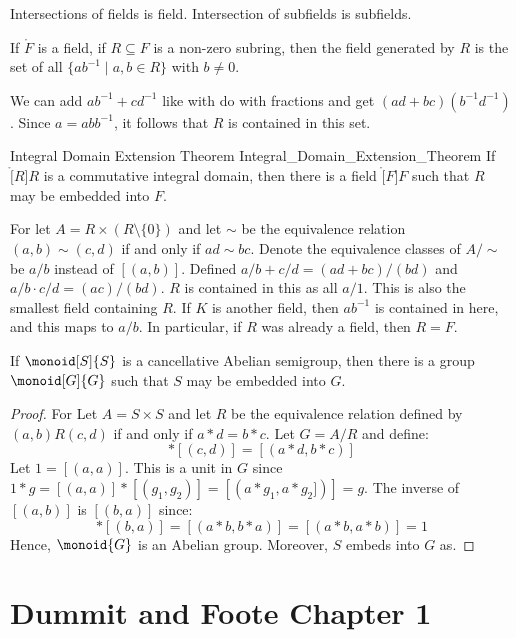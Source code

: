             Intersections of fields is field. Intersection of subfields is
            subfields.
            \begin{theorem}
                If $\ring{F}$ is a field, if $R\subseteq{F}$ is a non-zero
                subring, then the field generated by $R$ is the set of all
                $\{ab^{\minus{1}}\;|\;a,b\in{R}\}$ with $b\ne{0}$.
            \end{theorem}
            We can add $ab^{\minus{1}}+cd^{\minus{1}}$ like with do with
            fractions and get $(ad+bc)(b^{\minus{1}}d^{\minus{1}})$.
            Since $a=abb^{\minus{1}}$, it follows that $R$ is contained in
            this set.
            \begin{ftheorem}{Integral Domain Extension Theorem}
                            {Integral_Domain_Extension_Theorem}
                If $\ring[R]{R}$ is a commutative integral domain, then
                there is a field $\ring[F]{F}$ such that $R$ may be
                embedded into $F$.
            \end{ftheorem}
            \begin{bproof}
                For let $A=R\times(R\setminus\{0\})$ and let $\sim$ be the
                equivalence relation $(a,b)\sim(c,d)$ if and only if
                $ad\sim{b}c$. Denote the equivalence classes of
                $A/\sim$ be $a/b$ instead of $[(a,b)]$. Defined
                $a/b+c/d=(ad+bc)/(bd)$ and $a/b\cdot{c}/d=(ac)/(bd)$.
                $R$ is contained in this as all $a/1$. This is also the
                smallest field containing $R$. If $K$ is another field,
                then $ab^{\minus{1}}$ is contained in here, and this maps
                to $a/b$. In particular, if $R$ was already a field, then
                $R=F$.
            \end{bproof}
            \begin{theorem}
                If $\monoid[S]{S}$ is a cancellative Abelian semigroup, then
                there is a group $\monoid[G]{G}$ such that $S$ may be
                embedded into $G$.
            \end{theorem}
            \begin{proof}
                For Let $A=S\times{S}$ and let $R$ be the equivalence
                relation defined by $(a,b)R(c,d)$ if and only if
                $a*d=b*c$. Let $G=A/R$ and define:
                \begin{equation}
                    [(a,b)]*[(c,d)]=[(a*d,b*c)]
                \end{equation}
                Let $1=[(a,a)]$. This is a unit in $G$ since
                $1*g=[(a,a)]*[(g_{1},g_{2})]=[(a*g_{1},a*g_{2}])]=g$.
                The inverse of $[(a,b)]$ is $[(b,a)]$ since:
                \begin{equation}
                    [(a,b)]*[(b,a)]=[(a*b,b*a)]=[(a*b,a*b)]=1
                \end{equation}
                Hence, $\monoid{G}$ is an Abelian group. Moreover, $S$
                embeds into $G$ as.
            \end{proof}
\section{Dummit and Foote Chapter 1}
    
